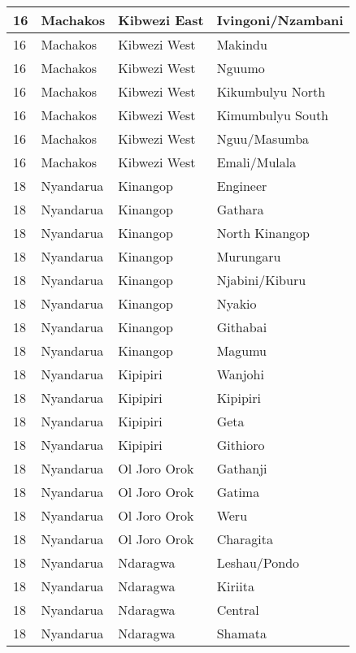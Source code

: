 \begin{table}[!ht]
\begin{tabular}{|l|l|l|l|}
        16 & Machakos & Kibwezi East & Ivingoni/Nzambani \\ \hline
        16 & Machakos & Kibwezi West & Makindu \\ \hline
        16 & Machakos & Kibwezi West & Nguumo \\ \hline
        16 & Machakos & Kibwezi West & Kikumbulyu North \\ \hline
        16 & Machakos & Kibwezi West & Kimumbulyu South \\ \hline
        16 & Machakos & Kibwezi West & Nguu/Masumba \\ \hline
        16 & Machakos & Kibwezi West & Emali/Mulala \\ \hline
        18 & Nyandarua & Kinangop & Engineer \\ \hline
        18 & Nyandarua & Kinangop & Gathara \\ \hline
        18 & Nyandarua & Kinangop & North Kinangop \\ \hline
        18 & Nyandarua & Kinangop & Murungaru \\ \hline
        18 & Nyandarua & Kinangop & Njabini/Kiburu \\ \hline
        18 & Nyandarua & Kinangop & Nyakio \\ \hline
        18 & Nyandarua & Kinangop & Githabai \\ \hline
        18 & Nyandarua & Kinangop & Magumu \\ \hline
        18 & Nyandarua & Kipipiri & Wanjohi \\ \hline
        18 & Nyandarua & Kipipiri & Kipipiri \\ \hline
        18 & Nyandarua & Kipipiri & Geta \\ \hline
        18 & Nyandarua & Kipipiri & Githioro \\ \hline
        18 & Nyandarua & Ol Joro Orok & Gathanji \\ \hline
        18 & Nyandarua & Ol Joro Orok & Gatima \\ \hline
        18 & Nyandarua & Ol Joro Orok & Weru \\ \hline
        18 & Nyandarua & Ol Joro Orok & Charagita \\ \hline
        18 & Nyandarua & Ndaragwa & Leshau/Pondo \\ \hline
        18 & Nyandarua & Ndaragwa & Kiriita \\ \hline
        18 & Nyandarua & Ndaragwa & Central \\ \hline
        18 & Nyandarua & Ndaragwa & Shamata \\ \hline

\end{tabular}
\end{table}
